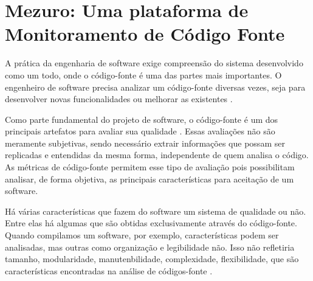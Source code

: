\chapter{Mezuro: Uma plataforma de Monitoramento de Código Fonte}

A prática da engenharia de software exige compreensão do sistema desenvolvido como um todo, onde o código-fonte é uma das partes mais importantes. O engenheiro de software precisa analizar um código-fonte diversas vezes, seja para desenvolver novas funcionalidades ou melhorar as existentes \cite{meirelles2010mezuro}.

Como parte fundamental do projeto de software, o código-fonte é um dos principais artefatos para avaliar sua qualidade \cite{meirelles2009crab}. Essas avaliações não são meramente subjetivas, sendo necessário extrair informações que possam ser replicadas e entendidas da mesma forma, independente de quem analisa o código. As métricas de código-fonte permitem esse tipo de avaliação pois possibilitam analisar, de forma objetiva, as principais características para aceitação de um software.

Há várias características que fazem do software um sistema de qualidade ou não. Entre elas há algumas que são obtidas exclusivamente através do código-fonte. Quando compilamos um software, por exemplo, características podem ser analisadas, mas outras como organização e legibilidade não. Isso não refletiria tamanho, modularidade, manutenbilidade, complexidade, flexibilidade, que são características encontradas na análise de códigos-fonte \cite{meirelles2013metrics}.


